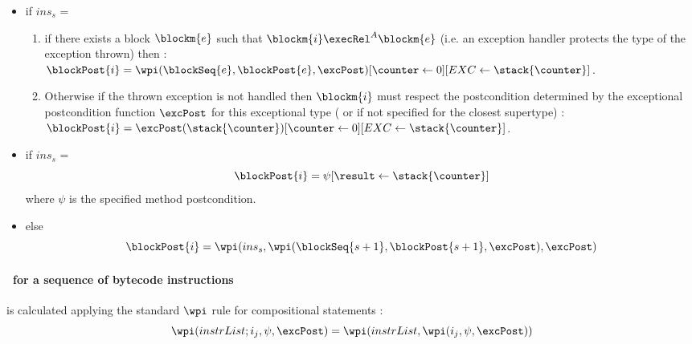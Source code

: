 \begin{defn}
\begin{itemize}
\item  if  $ins_s$ =   \\ 
	\begin{enumerate}
\item if there exists a block $\blockm{e}$ such that 
$\blockm{i} \execRel^A \blockm{e}$ (i.e. an exception handler protects the type of the exception thrown)
then :\\
$\blockPost{i }= \\ \wpi(\blockSeq{e}, \blockPost{e} ,\excPost)[\counter \leftarrow 0][EXC \leftarrow \stack{\counter}] $. \\
\item Otherwise if the thrown exception is not handled then $\blockm{i}$ must respect the postcondition determined by
the exceptional postcondition function $\excPost$ for this exceptional type ( or if not specified for the closest supertype) : \\ 
 $\blockPost{i }= \excPost(\stack{\counter}) [\counter \leftarrow 0][EXC \leftarrow \stack{\counter}] $. \\
    \end{enumerate}
\item  if  $ins_s$ =  \\
$$
   \blockPost{i } = \psi[\result \leftarrow \stack{\counter} ]    
$$
where $\psi $ is the specified method postcondition.
\item  else  
 $$ \blockPost{i} =  \wpi(  ins_s , \wpi( \blockSeq{s+1} ,  \blockPost{ s  +1}, \excPost) , \excPost)  $$ 
 \end{itemize}

\end{defn}

\paragraph{\wpi \ for a sequence of bytecode instructions} is calculated applying the standard $\wpi$ rule for compositional statements : 
$$ \wpi( instrList;i_{j}, \psi,\excPost ) =\wpi(instrList, \wpi(i_{j}, \psi,\excPost )) $$

